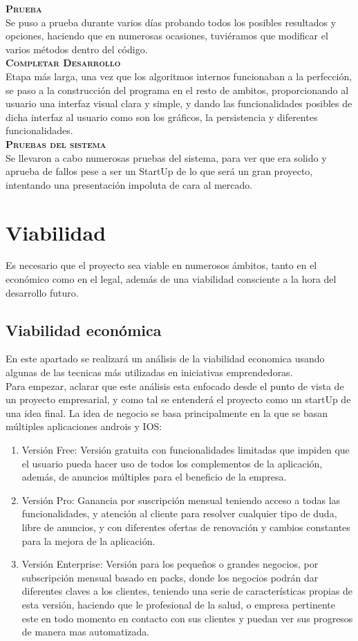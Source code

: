 \textbf{\textsc{Prueba}}\\
Se puso a prueba durante varios días probando todos los posibles resultados y opciones, haciendo que en numerosas ocasiones, tuviéramos que modificar el varios métodos dentro del código.\\

\textbf{\textsc{Completar Desarrollo}}\\
Etapa más larga, una vez que los algoritmos internos funcionaban a la perfección, se paso a la construcción del programa en el resto de ambitos, proporcionando al usuario una interfaz visual clara y simple, y dando las funcionalidades posibles de dicha interfaz al usuario como son los gráficos, la persistencia y diferentes funcionalidades.\\

\textbf{\textsc{Pruebas del sistema }}\\
Se llevaron a cabo numerosas pruebas del sistema, para ver que era solido y aprueba de fallos pese a ser un StartUp de lo que será un gran proyecto, intentando una presentación impoluta de cara al mercado.
\section{Viabilidad}
Es necesario que el proyecto sea viable en numerosos ámbitos, tanto en el económico como en el legal, además de una viabilidad consciente a la hora del desarrollo futuro.
\subsection{Viabilidad económica}
En este apartado se realizará un análisis de la viabilidad economica usando algunas de las tecnicas más utilizadas en iniciativas emprendedoras.\\
Para empezar,  aclarar que este análisis esta enfocado desde el punto de vista de un proyecto empresarial, y como tal se entenderá el proyecto como un startUp de una idea final.
La idea de negocio se basa principalmente en la que se basan múltiples aplicaciones androis y IOS:
\begin{enumerate}
\item Versión Free: Versión gratuita con funcionalidades limitadas que impiden que el usuario pueda hacer uso de todos los complementos de la aplicación, además, de anuncios múltiples para el beneficio de la empresa.
\item Versión Pro: Ganancia por suscripción mensual teniendo acceso a todas las funcionalidades, y atención al cliente para resolver cualquier tipo de duda, libre de anuncios, y con diferentes ofertas de renovación y cambios constantes para la mejora de la aplicación.
\item Versión Enterprise: Versión para los pequeños o grandes negocios, por subscripción mensual basado en packs, donde los negocios podrán dar diferentes claves a los clientes, teniendo una serie de características propias de esta versión, haciendo que le profesional de la salud, o empresa pertinente este en todo momento en contacto con sus clientes y puedan ver sus progresos de manera mas automatizada.
\end{enumerate}
